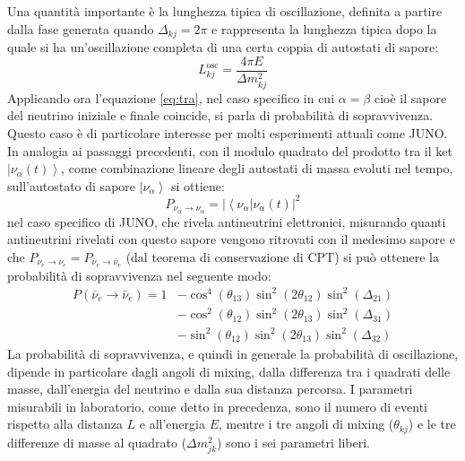  
 Una quantità importante è la lunghezza tipica di oscillazione, definita a partire dalla fase generata quando $\Delta _{kj}=2\pi$ e rappresenta la lunghezza tipica dopo la quale si ha un'oscillazione completa di una certa coppia di autostati di sapore:
\begin{equation}
    L_{kj}^{\text{osc}}=\frac{4\pi E}{\Delta m_{kj}^2}
\end{equation}
Applicando ora l'equazione \ref{eq:tra}, nel caso specifico in cui $\alpha=\beta$ cioè il sapore del neutrino iniziale e finale coincide, si parla di probabilità di sopravvivenza.  Questo caso è di particolare interesse per molti esperimenti attuali come JUNO. In analogia ai passaggi precedenti, con il modulo quadrato del prodotto tra il ket $\left|\nu_\alpha(t)\right\rangle$, come combinazione lineare degli autostati di massa evoluti nel tempo, sull'autostato di sapore $\left|\nu_\alpha\right\rangle$ si ottiene:
\begin{equation}
    P_{\nu_\alpha\to\nu_\alpha}=\left|\left\langle\nu_\alpha\right|\nu_\alpha(t)\right|^2
\end{equation}
nel caso specifico di JUNO, che rivela antineutrini elettronici, misurando quanti antineutrini rivelati con questo sapore vengono ritrovati con il medesimo sapore e che $P_{\nu_e\to\nu_e}=P_{\bar\nu_e\to\bar\nu_e}$ (dal teorema di conservazione di CPT) si può ottenere la probabilità di sopravvivenza nel seguente modo:
\begin{equation}
    \begin{aligned} P\left(\bar{\nu}_e \rightarrow \bar{\nu}_e\right)=1 & -\cos ^4\left(\theta_{13}\right) \sin ^2\left(2 \theta_{12}\right) \sin ^2\left(\Delta_{21}\right) \\ & -\cos ^2\left(\theta_{12}\right) \sin ^2\left(2 \theta_{13}\right) \sin ^2\left(\Delta_{31}\right) \\ & -\sin ^2\left(\theta_{12}\right) \sin ^2\left(2 \theta_{13}\right) \sin ^2\left(\Delta_{32}\right)\end{aligned}
    \label{eq:Prob}
\end{equation}
La probabilità di sopravvivenza, e quindi in generale la probabilità di oscillazione, dipende in particolare dagli angoli di mixing, dalla differenza tra i quadrati delle masse, dall'energia del neutrino e dalla sua distanza percorsa. I parametri misurabili in laboratorio, come detto in precedenza, sono il numero di eventi rispetto alla distanza $L$ e all'energia $E$, mentre i tre angoli di mixing ($\theta_{kj}$) e le tre differenze di masse al quadrato ($\Delta m_{jk}^2$) sono i sei parametri liberi. 

